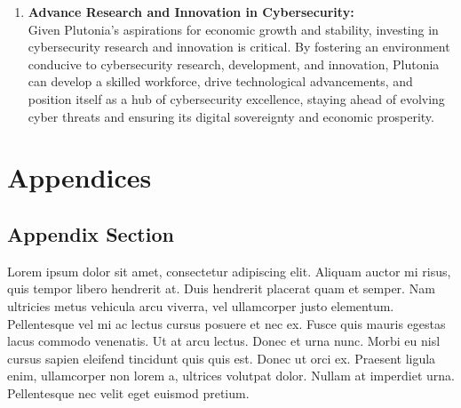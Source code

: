 \documentclass[
	a4paper, %
	12pt, %
]{CSSullivanBusinessReport}
\begin{document}
\begin{fullwidth}
\begin{justify}
\begin{enumerate}
	\item \textbf{Advance Research and Innovation in Cybersecurity:} \\Given Plutonia's aspirations for economic growth and stability, investing in cybersecurity research and innovation is critical. By fostering an environment conducive to cybersecurity research, development, and innovation, Plutonia can develop a skilled workforce, drive technological advancements, and position itself as a hub of cybersecurity excellence, staying ahead of evolving cyber threats and ensuring its digital sovereignty and economic prosperity.
\end{enumerate}



\newpage


\begin{twothirdswidth} %
	\printbibliography[title=Reference List] %
\end{twothirdswidth}


\newpage

\section*{Appendices}

\begin{appendices}

\section{Appendix Section}

Lorem ipsum dolor sit amet, consectetur adipiscing elit. Aliquam auctor mi risus, quis tempor libero hendrerit at. Duis hendrerit placerat quam et semper. Nam ultricies metus vehicula arcu viverra, vel ullamcorper justo elementum. Pellentesque vel mi ac lectus cursus posuere et nec ex. Fusce quis mauris egestas lacus commodo venenatis. Ut at arcu lectus. Donec et urna nunc. Morbi eu nisl cursus sapien eleifend tincidunt quis quis est. Donec ut orci ex. Praesent ligula enim, ullamcorper non lorem a, ultrices volutpat dolor. Nullam at imperdiet urna. Pellentesque nec velit eget euismod pretium.


\end{appendices}
\end{justify}
\end{fullwidth}
\end{document}
